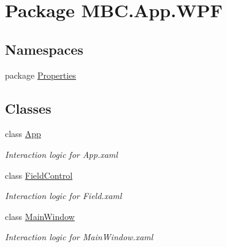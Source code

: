 \hypertarget{namespace_m_b_c_1_1_app_1_1_w_p_f}{\section{Package M\-B\-C.\-App.\-W\-P\-F}
\label{namespace_m_b_c_1_1_app_1_1_w_p_f}
}
\subsection*{Namespaces}
\begin{DoxyCompactItemize}
\item 
package \hyperlink{namespace_m_b_c_1_1_app_1_1_w_p_f_1_1_properties}{Properties}
\end{DoxyCompactItemize}
\subsection*{Classes}
\begin{DoxyCompactItemize}
\item 
class \hyperlink{class_m_b_c_1_1_app_1_1_w_p_f_1_1_app}{App}
\begin{DoxyCompactList}\small\item\em Interaction logic for App.\-xaml \end{DoxyCompactList}\item 
class \hyperlink{class_m_b_c_1_1_app_1_1_w_p_f_1_1_field_control}{Field\-Control}
\begin{DoxyCompactList}\small\item\em Interaction logic for Field.\-xaml \end{DoxyCompactList}\item 
class \hyperlink{class_m_b_c_1_1_app_1_1_w_p_f_1_1_main_window}{Main\-Window}
\begin{DoxyCompactList}\small\item\em Interaction logic for Main\-Window.\-xaml \end{DoxyCompactList}\end{DoxyCompactItemize}
